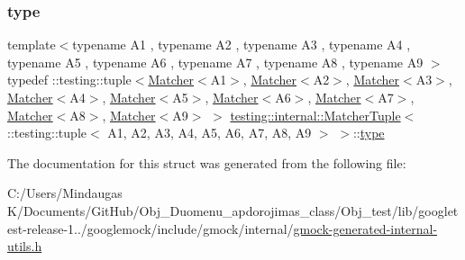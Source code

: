 \subsubsection{\texorpdfstring{type}{type}}
{\footnotesize\ttfamily template$<$typename A1 , typename A2 , typename A3 , typename A4 , typename A5 , typename A6 , typename A7 , typename A8 , typename A9 $>$ \\
typedef \+::testing\+::tuple$<$\mbox{\hyperlink{classtesting_1_1_matcher}{Matcher}}$<$A1$>$, \mbox{\hyperlink{classtesting_1_1_matcher}{Matcher}}$<$A2$>$, \mbox{\hyperlink{classtesting_1_1_matcher}{Matcher}}$<$A3$>$, \mbox{\hyperlink{classtesting_1_1_matcher}{Matcher}}$<$A4$>$, \mbox{\hyperlink{classtesting_1_1_matcher}{Matcher}}$<$A5$>$, \mbox{\hyperlink{classtesting_1_1_matcher}{Matcher}}$<$A6$>$, \mbox{\hyperlink{classtesting_1_1_matcher}{Matcher}}$<$A7$>$, \mbox{\hyperlink{classtesting_1_1_matcher}{Matcher}}$<$A8$>$, \mbox{\hyperlink{classtesting_1_1_matcher}{Matcher}}$<$A9$>$ $>$ \mbox{\hyperlink{structtesting_1_1internal_1_1_matcher_tuple}{testing\+::internal\+::\+Matcher\+Tuple}}$<$ \+::testing\+::tuple$<$ A1, A2, A3, A4, A5, A6, A7, A8, A9 $>$ $>$\+::\mbox{\hyperlink{structtesting_1_1internal_1_1_matcher_tuple_3_01_1_1testing_1_1tuple_3_01_a1_00_01_a2_00_01_a3_05ce0d9708ffc0cc1f9fec180f9f8202e_a022b424844dde9c01e4e40716be48f9f}{type}}}



The documentation for this struct was generated from the following file\+:\begin{DoxyCompactItemize}
\item 
C\+:/\+Users/\+Mindaugas K/\+Documents/\+Git\+Hub/\+Obj\+\_\+\+Duomenu\+\_\+apdorojimas\+\_\+class/\+Obj\+\_\+test/lib/googletest-\/release-\/1../googlemock/include/gmock/internal/\mbox{\hyperlink{gmock-generated-internal-utils_8h}{gmock-\/generated-\/internal-\/utils.\+h}}\end{DoxyCompactItemize}
